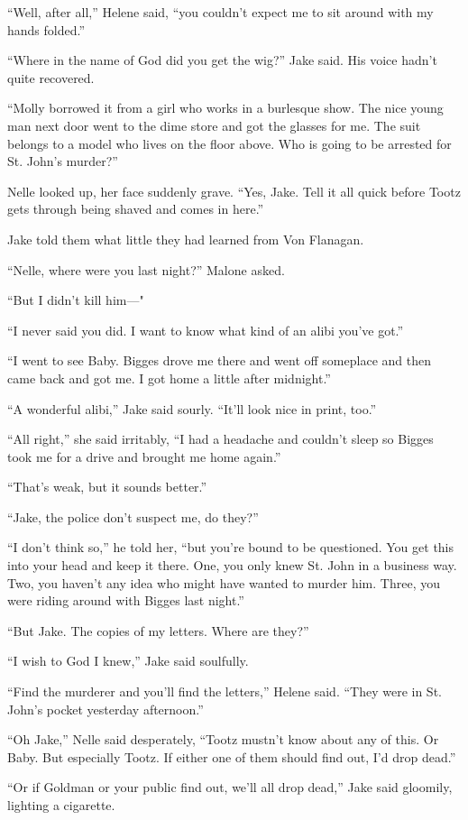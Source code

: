 \documentclass{novel}
\begin{document}
“Well, after all,” Helene said, “you couldn’t expect me to sit around with my hands folded.”

“Where in the name of God did you get the wig?” Jake said. His voice hadn’t quite recovered.

“Molly borrowed it from a girl who works in a burlesque show. The nice young man next door went to the dime store and got the glasses for me. The suit belongs to a model who lives on the floor above. Who is going to be arrested for St. John’s murder?”

Nelle looked up, her face suddenly grave. “Yes, Jake. Tell it all quick before Tootz gets through being shaved and comes in here.”

Jake told them what little they had learned from Von Flanagan.

“Nelle, where were you last night?” Malone asked.

“But I didn’t kill him—"

“I never said you did. I want to know what kind of an alibi you’ve got.”

“I went to see Baby. Bigges drove me there and went off someplace and then came back and got me. I got home a little after midnight.”

“A wonderful alibi,” Jake said sourly. “It’ll look nice in print, too.”

“All right,” she said irritably, “I had a headache and couldn’t sleep so Bigges took me for a drive and brought me home again.”

“That’s weak, but it sounds better.”

“Jake, the police don’t suspect me, do they?”

“I don’t think so,” he told her, “but you’re bound to be questioned. You get this into your head and keep it there. One, you only knew St. John in a business way. Two, you haven’t any idea who might have wanted to murder him. Three, you were riding around with Bigges last night.”

“But Jake. The copies of my letters. Where are they?”

“I wish to God I knew,” Jake said soulfully.

“Find the murderer and you’ll find the letters,” Helene said. “They were in St. John’s pocket yesterday afternoon.”

“Oh Jake,” Nelle said desperately, “Tootz mustn’t know about any of this. Or Baby. But especially Tootz. If either one of them should find out, I’d drop dead.”

“Or if Goldman or your public find out, we’ll all drop dead,” Jake said gloomily, lighting a cigarette.
\end{document}
